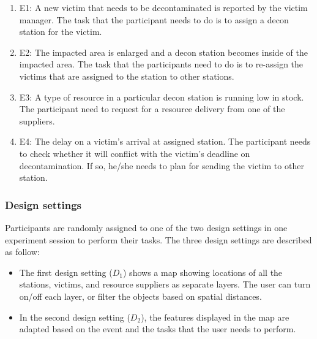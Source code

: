 \begin{enumerate}
	\item E1: A new victim that needs to be decontaminated is reported by the victim manager. The task that the participant needs to do is to assign a decon station for the victim.
	\item E2: The impacted area is enlarged and a decon station becomes inside of the impacted area. The task that the participants need to do is to re-assign the victims that are assigned to the station to other stations.
	\item E3: A type of resource in a particular decon station is running low in stock. The participant need to request for a resource delivery from one of the suppliers.
	\item E4: The delay on a victim's arrival at assigned station. The participant needs to check whether it will conflict with the victim's deadline on decontamination. If so, he/she needs to plan for sending the victim to other station.
\end{enumerate}


\subsubsection{Design settings} %
\label{sub:design_settings}
Participants are randomly assigned to one of the two design settings in one experiment session to perform their tasks. The three design settings are described as follow: 
\begin{itemize}
    \item The first design setting ($D_1$) shows a map showing locations of all the stations, victims, and resource suppliers as separate layers. The user can turn on/off each layer, or filter the objects based on spatial distances.
    
    \item In the second design setting ($D_2$), the features displayed in the map are adapted based on the event and the tasks that the user needs to perform. 
\end{itemize}

